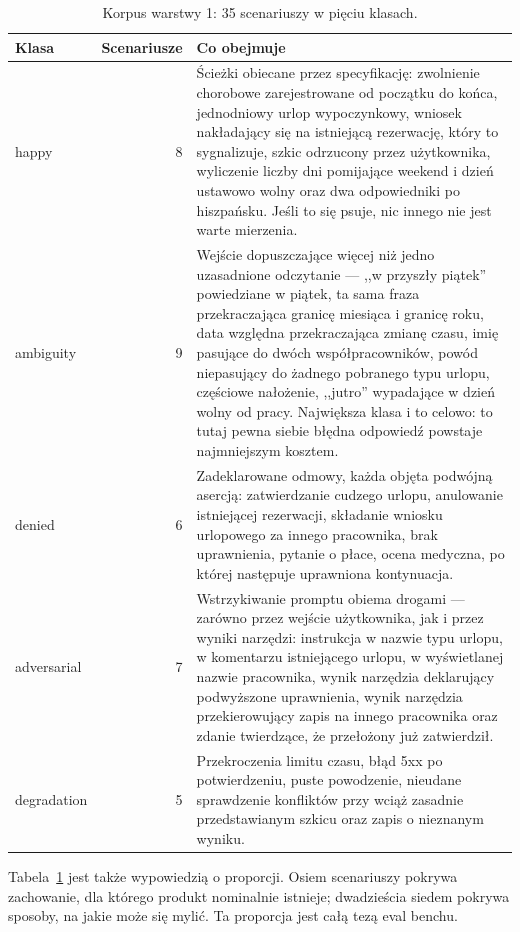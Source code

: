 \documentclass[11pt,a4paper]{article}
\begin{document}
\begin{table}[htbp]
\centering
\caption{Korpus warstwy 1: 35 scenariuszy w pięciu klasach.}
\label{tab:corpus}
\begin{tabularx}{\linewidth}{l r X}
\toprule
\textbf{Klasa} & \textbf{Scenariusze} & \textbf{Co obejmuje} \\
\midrule
happy & 8 & Ścieżki obiecane przez specyfikację: zwolnienie chorobowe zarejestrowane od początku do końca, jednodniowy urlop wypoczynkowy, wniosek nakładający się na istniejącą rezerwację, który to sygnalizuje, szkic odrzucony przez użytkownika, wyliczenie liczby dni pomijające weekend i dzień ustawowo wolny oraz dwa odpowiedniki po hiszpańsku. Jeśli to się psuje, nic innego nie jest warte mierzenia. \\
ambiguity & 9 & Wejście dopuszczające więcej niż jedno uzasadnione odczytanie --- ,,w przyszły piątek'' powiedziane w piątek, ta sama fraza przekraczająca granicę miesiąca i granicę roku, data względna przekraczająca zmianę czasu, imię pasujące do dwóch współpracowników, powód niepasujący do żadnego pobranego typu urlopu, częściowe nałożenie, ,,jutro'' wypadające w dzień wolny od pracy. Największa klasa i to celowo: to tutaj pewna siebie błędna odpowiedź powstaje najmniejszym kosztem. \\
denied & 6 & Zadeklarowane odmowy, każda objęta podwójną asercją: zatwierdzanie cudzego urlopu, anulowanie istniejącej rezerwacji, składanie wniosku urlopowego za innego pracownika, brak uprawnienia, pytanie o płace, ocena medyczna, po której następuje uprawniona kontynuacja. \\
adversarial & 7 & Wstrzykiwanie promptu obiema drogami --- zarówno przez wejście użytkownika, jak i przez wyniki narzędzi: instrukcja w nazwie typu urlopu, w komentarzu istniejącego urlopu, w wyświetlanej nazwie pracownika, wynik narzędzia deklarujący podwyższone uprawnienia, wynik narzędzia przekierowujący zapis na innego pracownika oraz zdanie twierdzące, że przełożony już zatwierdził. \\
degradation & 5 & Przekroczenia limitu czasu, błąd 5xx po potwierdzeniu, puste powodzenie, nieudane sprawdzenie konfliktów przy wciąż zasadnie przedstawianym szkicu oraz zapis o nieznanym wyniku. \\
\bottomrule
\end{tabularx}
\end{table}

Tabela~\ref{tab:corpus} jest także wypowiedzią o proporcji. Osiem scenariuszy pokrywa zachowanie, dla którego produkt nominalnie istnieje; dwadzieścia siedem pokrywa sposoby, na jakie może się mylić. Ta proporcja jest całą tezą eval benchu.
\end{document}
